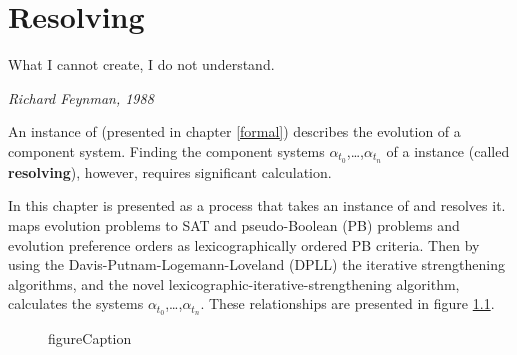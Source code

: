 \chapter{Resolving \modelname}
\label{implementation}
\epigraph{What I cannot create, I do not understand.}
{\textit{Richard Feynman, 1988}}

An instance of \modelname (presented in chapter \ref{formal}) describes the evolution of a component system.
Finding the component systems $\alpha_{t_0}$,\ldots,$\alpha_{t_n}$ of a \modelname instance (called \textbf{resolving}), however, requires significant calculation.

In this chapter \modelimpl is presented as a process that takes an instance of \modelname and resolves it.
\modelimpl maps evolution problems to SAT and pseudo-Boolean  (PB) \citep{dixon2004automating} problems and evolution preference orders as lexicographically ordered PB criteria.
Then by using the Davis-Putnam-Logemann-Loveland (DPLL) \citep{Davis1960, davis1962machine}
the iterative strengthening \citep{calistri1994iterative, le2010sat4j} algorithms,
and the novel lexicographic-iterative-strengthening algorithm, \modelimpl calculates the systems $\alpha_{t_0}$,\ldots,$\alpha_{t_n}$.
These relationships are presented in figure \ref{impl.modelsatdiagram}.

\begin{figure}[htp]
\begin{center}
  \caption[labelInTOC]{figureCaption}
  \label{impl.modelsatdiagram}
\end{center}
\end{figure}

